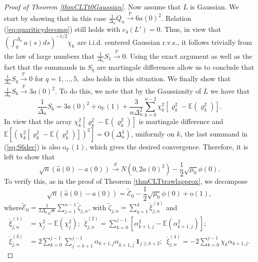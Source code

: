 \documentclass{article}
\theoremstyle{plain}
\theoremstyle{definition}
\theoremstyle{remark}
\begin{document}
\begin{appendix}
\begin{proof}[Proof of Theorem \ref{thmCLTt0Gaussian}]
	Now assume that $L$ is Gaussian. We start by showing that in this
	case $\frac{1}{\Delta_{n}}Q_{n}\overset{\mathbb{P}}{\rightarrow}6a(0)^{2}$.
	Relation (\ref{eq:quariticydecomp}) still holds with $c_{4}(L')=0$.
	Thus, in view that $(\int_{0}^{\Delta_{n}}a(s)ds)^{-1/2}\chi_{k}$
	are i.i.d. centered Gaussian r.v.s., it follows trivially from the
	law of large numbers that $\frac{1}{\Delta_{n}}S_{1}\overset{\mathbb{P}}{\rightarrow}0.$
	Using the exact argument as well as the fact that the summands in
	$S_{q}$ are martingale differences allow us to conclude that $\frac{1}{\Delta_{n}}S_{q}\overset{\mathbb{P}}{\rightarrow}0$
	for $q=1,\ldots,5,$ also holds in this situation. We finally show
	that $\frac{1}{\Delta_{n}}S_{6}\overset{\mathbb{P}}{\rightarrow}3a(0)^{2}.$
	To do this, we note that by the Gaussianity of $L$ we have that
	\begin{equation}
		\frac{1}{\Delta_{n}}S_{6}=3a(0)^{2}+\mathrm{o}_{\mathbb{P}}(1)+\frac{3}{n\Delta_{n}^{2}}\sum_{k=0}^{n-2}\chi_{k}^{2}[\varrho_{k}^{2}-\mathbb{E}(\varrho_{k}^{2})].\label{eq:S6dec}
	\end{equation}
	In view that the array $\chi_{k}^{2}[\varrho_{k}^{2}-\mathbb{E}(\varrho_{k}^{2})]$
	is martingale difference and $\mathbb{E}\left[(\chi_{k}^{2}[\varrho_{k}^{2}-\mathbb{E}(\varrho_{k}^{2})])^{2}\right]=\mathrm{O}(\Delta_{n}^{4})$,
	uniformly on $k$, the last summand in (\ref{eq:S6dec}) is also $\mathrm{o}_{\mathbb{P}}(1)$,
	which gives the desired convergence. Therefore, it is left to show that 
	\[
	\sqrt{n}\left(\hat{a}(0)-a(0)\right)\overset{d}{\rightarrow}N(0,2a(0)^{2})-\frac{1}{2}\sqrt{\mu_{0}}\phi(0).
	\]
	To verify this, as in the proof of Theorem \ref{thmCLTtrawlapprox}, 	we decompose
	\begin{equation}
		\sqrt{n}\left(\hat{a}(0)-a(0)\right)=\mathcal{\tilde{E}}_{0}-\frac{1}{2}\sqrt{\mu_{0}}\phi(0)+\mathrm{o}(1),\label{statisticalerror-1}
	\end{equation}
	where$\mathcal{\tilde{E}}_{0}=\frac{1}{2\Delta_{n}\sqrt{n}}\sum_{j=1}^{n-1}\tilde{\zeta}_{j,n}$, 
	with $\tilde{\zeta}_{j,n}=\sum_{q=1}^{4}\acute{\xi}_{j,n}^{(q)}$ and
	\[
	\begin{aligned}\acute{\xi}_{j,n}^{(1)} & =\chi_{j}^{2}-\mathbb{E}(\chi_{j}^{2});\,\,\,\acute{\xi}_{j,n}^{(2)}=\sum_{k=0}^{j-1}[\alpha_{k+1,j}^{2}-\mathbb{E}(\alpha_{k+1,j}^{2})];\\
		\acute{\xi}_{j,n}^{(3)} & =2\sum_{k=0}^{j-1}\sum_{j^{\prime}=k+1}^{j-1}\alpha_{k+1,j}\alpha_{k+1,j^{\prime}}\mathbf{1}_{j\geq k+2};\,\,\,\acute{\xi}_{j,n}^{(4)}=-2\sum_{k=0}^{j-1}\chi_{k}\alpha_{k+1,j}.

\end{aligned}\]
\end{proof}
\end{appendix}
\end{document}
